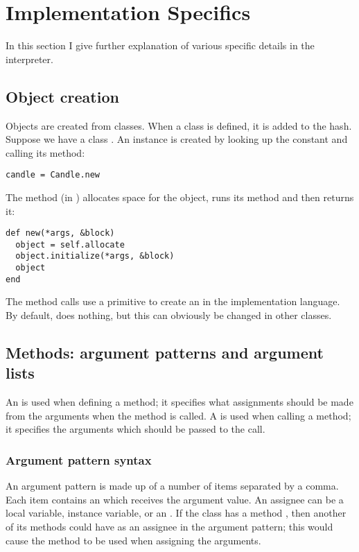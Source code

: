 \section{Implementation Specifics}

In this section I give further explanation of various specific details in the interpreter.

\subsection{Object creation}

Objects are created from classes. When a class is defined, it is added to the  hash. Suppose we have a class . An instance is created by looking up the  constant and calling its  method:

\begin{lstlisting}
candle = Candle.new
\end{lstlisting}

The  method (in ) allocates space for the object, runs its  method and then returns it:

\begin{lstlisting}
def new(*args, &block)
  object = self.allocate
  object.initialize(*args, &block)
  object
end
\end{lstlisting}

The  method calls use a primitive to create an  in the implementation language. By default,  does nothing, but this can obviously be changed in other classes.

\subsection{Methods: argument patterns and argument lists}

An  is used when defining a method; it specifies what assignments should be made from the arguments when the method is called. A  is used when calling a method; it specifies the arguments which should be passed to the call.

\subsubsection{Argument pattern syntax}

An argument pattern is made up of a number of items separated by a comma. Each item contains an  which receives the argument value. An assignee can be a local variable, instance variable, or an . If the class has a method , then another of its methods could have  as an assignee in the argument pattern; this would cause the  method to be used when assigning the arguments.


